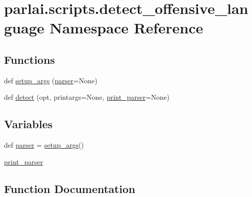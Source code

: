 \hypertarget{namespaceparlai_1_1scripts_1_1detect__offensive__language}{}\section{parlai.\+scripts.\+detect\+\_\+offensive\+\_\+language Namespace Reference}
\label{namespaceparlai_1_1scripts_1_1detect__offensive__language}
\subsection*{Functions}
\begin{DoxyCompactItemize}
\item 
def \hyperlink{namespaceparlai_1_1scripts_1_1detect__offensive__language_ab3f20447fd2442afdcd45dd77b619378}{setup\+\_\+args} (\hyperlink{namespaceparlai_1_1scripts_1_1detect__offensive__language_a87baca22cf582a78790990b713c5b8ea}{parser}=None)
\item 
def \hyperlink{namespaceparlai_1_1scripts_1_1detect__offensive__language_aecc66ec4441e506a93d25964889c185f}{detect} (opt, printargs=None, \hyperlink{namespaceparlai_1_1scripts_1_1detect__offensive__language_acb74ddd962fd2fc50270c37cdcd65c83}{print\+\_\+parser}=None)
\end{DoxyCompactItemize}
\subsection*{Variables}
\begin{DoxyCompactItemize}
\item 
def \hyperlink{namespaceparlai_1_1scripts_1_1detect__offensive__language_a87baca22cf582a78790990b713c5b8ea}{parser} = \hyperlink{namespaceparlai_1_1scripts_1_1detect__offensive__language_ab3f20447fd2442afdcd45dd77b619378}{setup\+\_\+args}()
\item 
\hyperlink{namespaceparlai_1_1scripts_1_1detect__offensive__language_acb74ddd962fd2fc50270c37cdcd65c83}{print\+\_\+parser}
\end{DoxyCompactItemize}


\subsection{Function Documentation}
\mbox{\label{namespaceparlai_1_1scripts_1_1detect__offensive__language_aecc66ec4441e506a93d25964889c185f}} 
